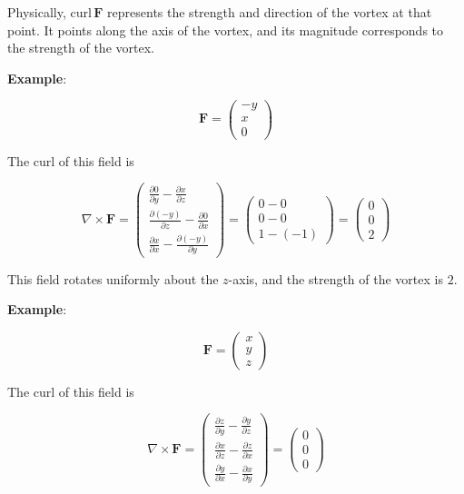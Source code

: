 Physically, \(\mathrm{curl}\,\mathbf{F}\) represents the strength and
direction of the vortex at that point. It points along the axis of the
vortex, and its magnitude corresponds to the strength of the vortex.

\textbf{Example}:

\[
\mathbf{F}
=
\begin{pmatrix}
-y\\
x\\
0
\end{pmatrix}
\]

The curl of this field is

\[\nabla \times \mathbf{F} = \begin{pmatrix}
\frac{\partial 0}{\partial y} - \frac{\partial x}{\partial z} \\[0.3em]
\frac{\partial (-y)}{\partial z} - \frac{\partial 0}{\partial x} \\[0.3em]
\frac{\partial x}{\partial x} - \frac{\partial (-y)}{\partial y}
\end{pmatrix} = \begin{pmatrix}
0 - 0 \\ 0 - 0 \\ 1 - (-1)
\end{pmatrix} = \begin{pmatrix} 0 \\ 0 \\ 2 \end{pmatrix}\]

This field rotates uniformly about the \(z\)-axis, and the strength of
the vortex is \(2\).

\textbf{Example}:

\[
\mathbf{F}
=
\begin{pmatrix}
x\\
y\\
z
\end{pmatrix}
\]

The curl of this field is

\[\nabla \times \mathbf{F} = \begin{pmatrix}
\frac{\partial z}{\partial y} - \frac{\partial y}{\partial z} \\[0.3em]
\frac{\partial x}{\partial z} - \frac{\partial z}{\partial x} \\[0.3em]
\frac{\partial y}{\partial x} - \frac{\partial x}{\partial y}
\end{pmatrix} = \begin{pmatrix} 0 \\ 0 \\ 0 \end{pmatrix}\]

